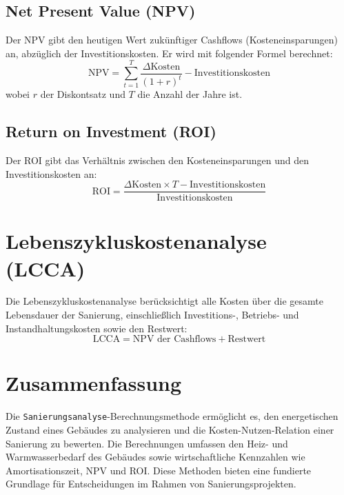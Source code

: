 \subsection{Net Present Value (NPV)}
Der NPV gibt den heutigen Wert zukünftiger Cashflows (Kosteneinsparungen) an, abzüglich der Investitionskosten. Er wird mit folgender Formel berechnet:
\[
\text{NPV} = \sum_{t=1}^{T} \frac{\Delta \text{Kosten}}{(1 + r)^t} - \text{Investitionskosten}
\]
wobei \( r \) der Diskontsatz und \( T \) die Anzahl der Jahre ist.

\subsection{Return on Investment (ROI)}
Der ROI gibt das Verhältnis zwischen den Kosteneinsparungen und den Investitionskosten an:
\[
\text{ROI} = \frac{\Delta \text{Kosten} \times T - \text{Investitionskosten}}{\text{Investitionskosten}}
\]

\section{Lebenszykluskostenanalyse (LCCA)}
Die Lebenszykluskostenanalyse berücksichtigt alle Kosten über die gesamte Lebensdauer der Sanierung, einschließlich Investitions-, Betriebs- und Instandhaltungskosten sowie den Restwert:
\[
\text{LCCA} = \text{NPV der Cashflows} + \text{Restwert}
\]

\section{Zusammenfassung}
Die \texttt{Sanierungsanalyse}-Berechnungsmethode ermöglicht es, den energetischen Zustand eines Gebäudes zu analysieren und die Kosten-Nutzen-Relation einer Sanierung zu bewerten. Die Berechnungen umfassen den Heiz- und Warmwasserbedarf des Gebäudes sowie wirtschaftliche Kennzahlen wie Amortisationszeit, NPV und ROI. Diese Methoden bieten eine fundierte Grundlage für Entscheidungen im Rahmen von Sanierungsprojekten.
